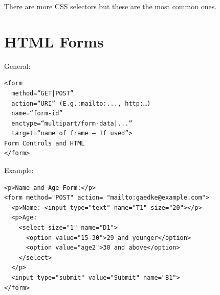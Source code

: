 \documentclass[11pt]{article}
\begin{document}
There are more CSS selectors but these are the most common ones.
\section{HTML Forms}
\label{sec:orge97d25b}
General:
\begin{verbatim}
<form
  method=“GET|POST”
  action=“URI” (E.g.:mailto:..., http:…)
  name=“form-id”
  enctype=“multipart/form-data|...”
  target=“name of frame – If used”>
Form Controls and HTML
</form>
\end{verbatim}
Example:
\begin{verbatim}
<p>Name and Age Form:</p>
<form method="POST" action= "mailto:gaedke@example.com">
  <p>Name: <input type="text" name="T1" size="20"></p>
  <p>Age:
    <select size="1" name="D1">
      <option value="15-30">29 and younger</option>
      <option value="age2">30 and above</option>
    </select>
  </p>
  <input type="submit" value="Submit" name="B1">
</form>
\end{verbatim}
\end{document}
